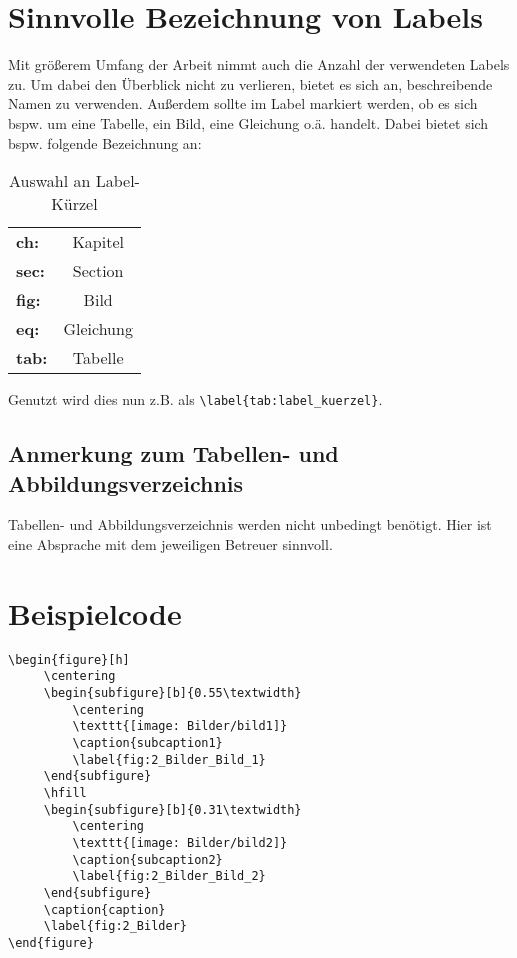 \chapter{Sinnvolle Bezeichnung von Labels}
Mit größerem Umfang der Arbeit nimmt auch die Anzahl der verwendeten Labels zu. Um dabei den Überblick nicht zu verlieren, bietet es sich an, beschreibende Namen zu verwenden. Außerdem sollte im Label markiert werden, ob es sich bspw. um eine Tabelle, ein Bild, eine Gleichung o.ä. handelt. Dabei bietet sich bspw. folgende Bezeichnung an: 
\begin{table}[ht]
\centering 
\begin{tabular}{l c}
\textbf{ch:}& Kapitel\\
\textbf{sec:}& Section\\
\textbf{fig:}& Bild\\
\textbf{eq:}& Gleichung\\
\textbf{tab:}& Tabelle\\
\end{tabular}
\caption{Auswahl an Label-Kürzel}
\end{table}

Genutzt wird dies nun z.B. als \verb+\label{tab:label_kuerzel}+.

\section{Anmerkung zum Tabellen- und Abbildungsverzeichnis}
Tabellen- und Abbildungsverzeichnis werden nicht unbedingt benötigt. Hier ist eine Absprache mit dem jeweiligen Betreuer sinnvoll. 

\chapter{Beispielcode}
\label{code_subfig}
\begin{lstlisting}
\begin{figure}[h]
     \centering
     \begin{subfigure}[b]{0.55\textwidth}
         \centering
         \texttt{[image: Bilder/bild1]}
         \caption{subcaption1}
         \label{fig:2_Bilder_Bild_1}
     \end{subfigure}
     \hfill
     \begin{subfigure}[b]{0.31\textwidth}
         \centering
         \texttt{[image: Bilder/bild2]}
         \caption{subcaption2}
         \label{fig:2_Bilder_Bild_2}
     \end{subfigure}
     \caption{caption}
     \label{fig:2_Bilder}
\end{figure}
\end{lstlisting}